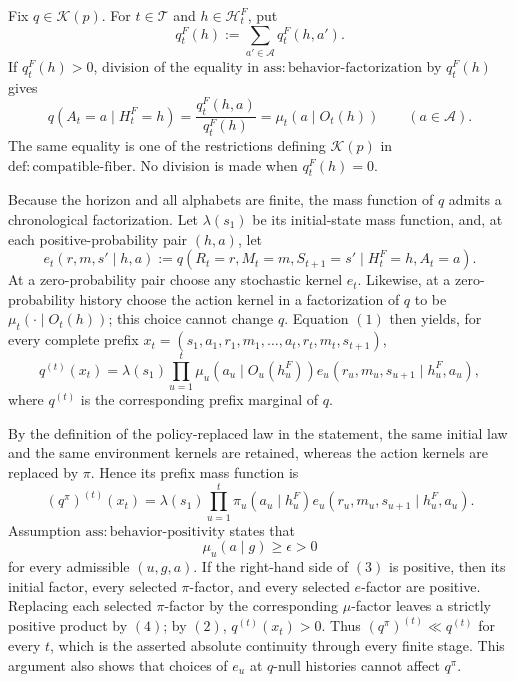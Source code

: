 Fix \(q\in\mathcal K(p)\).  For \(t\in\mathcal T\) and \(h\in\mathcal H_t^F\), put
\[
q_t^F(h):=\sum_{a'\in\mathcal A}q_t^F(h,a').
\]
If \(q_t^F(h)>0\), division of the equality in
\(\mathrm{ass{:}behavior\text{-}factorization}\) by \(q_t^F(h)\) gives
\[
q(A_t=a\mid H_t^F=h)
=\frac{q_t^F(h,a)}{q_t^F(h)}
=\mu_t(a\mid O_t(h))
\qquad(a\in\mathcal A).
\tag{1}
\]
The same equality is one of the restrictions defining \(\mathcal K(p)\) in
\(\mathrm{def{:}compatible\text{-}fiber}\).  No division is made when
\(q_t^F(h)=0\).

Because the horizon and all alphabets are finite, the mass function of \(q\)
admits a chronological factorization.  Let \(\lambda(s_1)\) be its initial-state
mass function, and, at each positive-probability pair \((h,a)\), let
\[
e_t(r,m,s'\mid h,a)
:=q(R_t=r,M_t=m,S_{t+1}=s'\mid H_t^F=h,A_t=a).
\]
At a zero-probability pair choose any stochastic kernel \(e_t\).  Likewise, at
a zero-probability history choose the action kernel in a factorization of \(q\)
to be \(\mu_t(\cdot\mid O_t(h))\); this choice cannot change \(q\).  Equation
\((1)\) then yields, for every complete prefix
\(x_t=(s_1,a_1,r_1,m_1,\ldots,a_t,r_t,m_t,s_{t+1})\),
\[
q^{(t)}(x_t)
=\lambda(s_1)\prod_{u=1}^t
\mu_u(a_u\mid O_u(h_u^F))
e_u(r_u,m_u,s_{u+1}\mid h_u^F,a_u),
\tag{2}
\]
where \(q^{(t)}\) is the corresponding prefix marginal of \(q\).

By the definition of the policy-replaced law in the statement, the same
initial law and the same environment kernels are retained, whereas the action
kernels are replaced by \(\pi\).  Hence its prefix mass function is
\[
(q^\pi)^{(t)}(x_t)
=\lambda(s_1)\prod_{u=1}^t
\pi_u(a_u\mid h_u^F)
e_u(r_u,m_u,s_{u+1}\mid h_u^F,a_u).
\tag{3}
\]
Assumption \(\mathrm{ass{:}behavior\text{-}positivity}\) states that
\[
\mu_u(a\mid g)\geq\epsilon>0
\tag{4}
\]
for every admissible \((u,g,a)\).  If the right-hand side of \((3)\) is
positive, then its initial factor, every selected \(\pi\)-factor, and every
selected \(e\)-factor are positive.  Replacing each selected \(\pi\)-factor by
the corresponding \(\mu\)-factor leaves a strictly positive product by
\((4)\); by \((2)\), \(q^{(t)}(x_t)>0\).  Thus
\((q^\pi)^{(t)}\ll q^{(t)}\) for every \(t\), which is the asserted absolute
continuity through every finite stage.  This argument also shows that choices
of \(e_u\) at \(q\)-null histories cannot affect \(q^\pi\).

